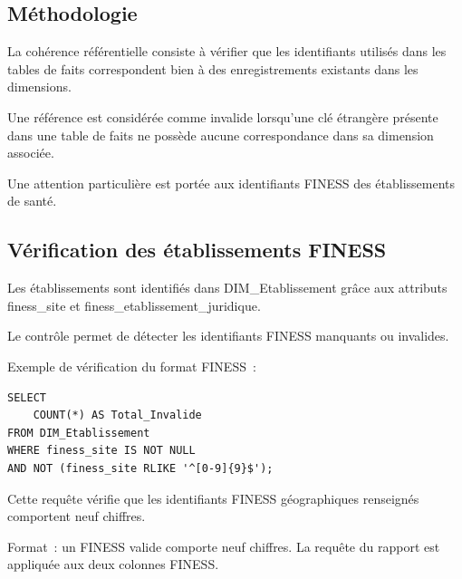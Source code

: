 \subsection{Méthodologie}

\noindent La cohérence référentielle consiste à vérifier que les identifiants utilisés dans les tables de faits correspondent bien à des enregistrements existants dans les dimensions.

\noindent Une référence est considérée comme invalide lorsqu'une clé étrangère présente dans une table de faits ne possède aucune correspondance dans sa dimension associée.

\noindent Une attention particulière est portée aux identifiants FINESS des établissements de santé.

\subsection{Vérification des établissements FINESS}

\noindent Les établissements sont identifiés dans DIM\_Etablissement grâce aux attributs finess\_site et finess\_etablissement\_juridique.

\noindent Le contrôle permet de détecter les identifiants FINESS manquants ou invalides.

\noindent Exemple de vérification du format FINESS~:

\begin{verbatim}
SELECT
    COUNT(*) AS Total_Invalide
FROM DIM_Etablissement
WHERE finess_site IS NOT NULL
AND NOT (finess_site RLIKE '^[0-9]{9}$');
\end{verbatim}

\noindent Cette requête vérifie que les identifiants FINESS géographiques renseignés comportent neuf chiffres.

\noindent Format~: un FINESS valide comporte neuf chiffres. La requête du rapport est appliquée aux deux colonnes FINESS.

